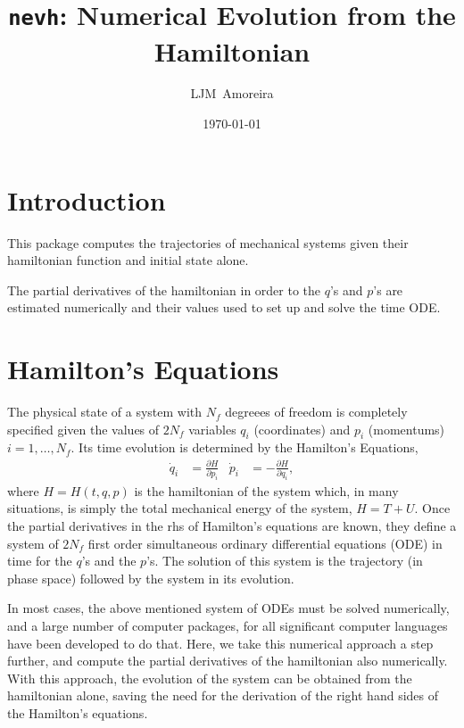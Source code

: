 \documentclass{article}
\title{\texttt{nevh}: Numerical Evolution from the Hamiltonian}
\date{\today}
\author{LJM~Amoreira}
\newcommand{\pd}[2]{\frac{\partial#1}{\partial#2}}
\begin{document}
\maketitle
\section{Introduction}
This package computes the trajectories of mechanical systems given their
hamiltonian function and initial state alone.

The partial derivatives of the hamiltonian in order to the $q$'s and $p$'s are
estimated numerically and their values used to set up and solve the time ODE.

\section{Hamilton's Equations}
The physical state of a system with $N_f$ degreees of freedom is completely
specified given the values of $2N_f$ variables $q_i$ (coordinates) and $p_i$
(momentums) $i=1,\ldots,N_f$.  Its time evolution is determined by the
Hamilton's Equations,
\begin{align}
  \dot q_i&=\pd{H}{p_i}&
  \dot p_i&=-\pd{H}{q_i},
\end{align}
where $H=H(t,q,p)$ is the hamiltonian of the system which, in many situations,
is simply the total mechanical energy of the system, $H=T+U$. Once the partial
derivatives in the rhs of Hamilton's equations are known, they define a system
of $2N_f$ first order simultaneous ordinary differential equations (ODE) in time
for the $q$'s and the $p$'s. The solution of this system is the trajectory (in
phase space) followed by the system in its evolution.

In most cases, the above mentioned system of ODEs must be solved numerically,
and a large number of computer packages, for all significant computer languages
have been developed to do that. Here, we take this numerical approach a step
further, and compute the partial derivatives of the hamiltonian also
numerically. With this approach, the evolution of the system can be obtained
from the hamiltonian alone, saving the need for the derivation of the right hand
sides of the Hamilton's equations. 
\end{document}
